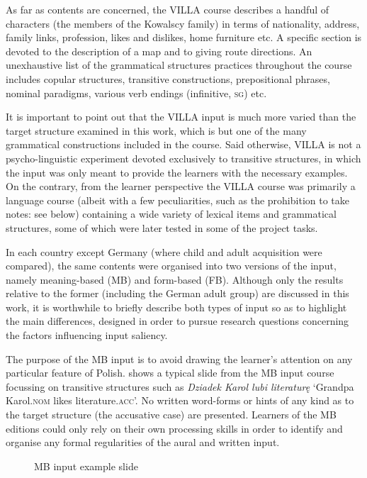 As far as contents are concerned, the VILLA course describes a handful of characters (the members of the Kowalscy family) in terms of nationality, address, family links, profession, likes and dislikes, home furniture etc. A specific section is devoted to the description of a map and to giving route directions. An unexhaustive list of the grammatical structures practices throughout the course includes copular structures, transitive constructions, prepositional phrases, nominal paradigms, various verb endings (infinitive, \textsc{sg}) etc.

It is important to point out that the VILLA input is much more varied than the target structure examined in this work, which is but one of the many grammatical constructions included in the course. Said otherwise, VILLA is not a psycho-linguistic experiment devoted exclusively to transitive structures, in which the input was only meant to provide the learners with the necessary examples. On the contrary, from the learner perspective the VILLA course was primarily a language course (albeit with a few peculiarities, such as the prohibition to take notes: see below) containing a wide variety of lexical items and grammatical structures, some of which were later tested in some of the project tasks.

In each country except Germany (where child and adult acquisition were compared), the same contents were organised into two versions of the input, namely meaning-based (MB) and form-based (FB). Although only the results relative to the former (including the German adult group) are discussed in this work, it is worthwhile to briefly describe both types of input so as to highlight the main differences, designed in order to pursue research questions concerning the factors influencing input saliency. 

The purpose of the MB input is to avoid drawing the learner’s attention on any particular feature of Polish.  shows a typical slide from the MB input course focussing on transitive structures such as \textit{Dziadek Karol lubi literaturę} ‘Grandpa Karol.\textsc{nom} likes literature.\textsc{acc}’. No written word-forms or hints of any kind as to the target structure (the accusative case) are presented. Learners of the MB editions could only rely on their own processing skills in order to identify and organise any formal regularities of the aural and written input.

\begin{figure}[p]
    \caption{MB input example slide}
    \label{fig:02:1}
\end{figure}

